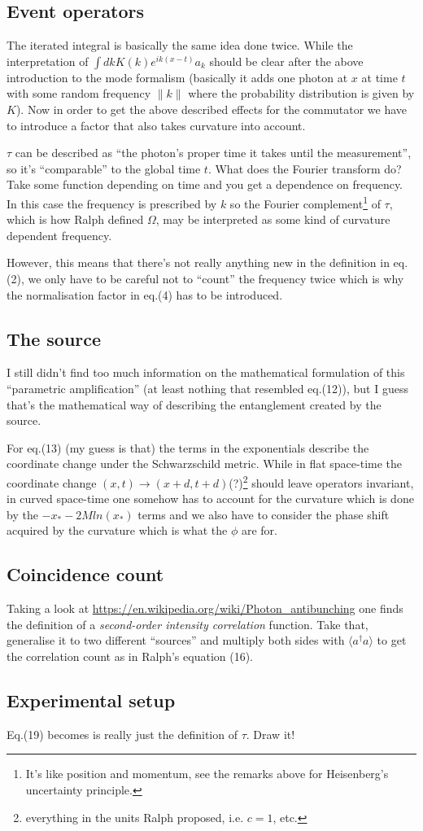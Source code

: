 \documentclass[11pt]{report}
\begin{document}
\subsection{Event operators}
The iterated integral is basically the same idea done twice. While the interpretation of $\int dk K(k) e^{ik(x-t)}a_k$ should be clear after the above introduction to the mode formalism (basically it adds one photon at $x$ at time $t$ with some random frequency $\|k\|$ where the probability distribution is given by $K$). Now in order to get the above described effects for the commutator we have to introduce a factor that also takes curvature into account.

$\tau$ can be described as ``the photon's proper time it takes until the measurement'', so it's ``comparable'' to the global time $t$. What does the Fourier transform do? Take some function depending on time and you get a dependence on frequency. In this case the frequency is prescribed by $k$ so the Fourier complement\footnote{It's like position and momentum, see the remarks above for Heisenberg's uncertainty principle.} of $\tau$, which is how Ralph defined $\Omega$, may be interpreted as some kind of curvature dependent frequency.

However, this means that there's not really anything new in the definition in eq.(2), we only have to be careful not to ``count'' the frequency twice which is why the normalisation factor in eq.(4) has to be introduced.

\subsection{The source}
I still didn't find too much information on the mathematical formulation of this ``parametric amplification'' (at least nothing that resembled eq.(12)), but I guess that's the mathematical way of describing the entanglement created by the source.

For eq.(13) (my guess is that) the terms in the exponentials describe the coordinate change under the Schwarzschild metric. While in flat space-time the coordinate change $(x,t)\rightarrow (x+d,t+d)$(?)\footnote{everything in the units Ralph proposed, i.e. $c=1$, etc.} should leave operators invariant, in curved space-time one somehow has to account for the curvature which is done by the $-x_*-2Mln(x_*)$ terms and we also have to consider the phase shift acquired by the curvature which is what the $\phi$ are for.

\subsection{Coincidence count}
Taking a look at \url{https://en.wikipedia.org/wiki/Photon_antibunching} one finds the definition of a \textit{second-order intensity correlation} function. Take that, generalise it to two different ``sources'' and multiply both sides with $\langle a^\dagger a\rangle$ to get the correlation count as in Ralph's equation (16).

\subsection{Experimental setup}
Eq.(19) becomes is really just the definition of $\tau$. Draw it!
\end{document}
